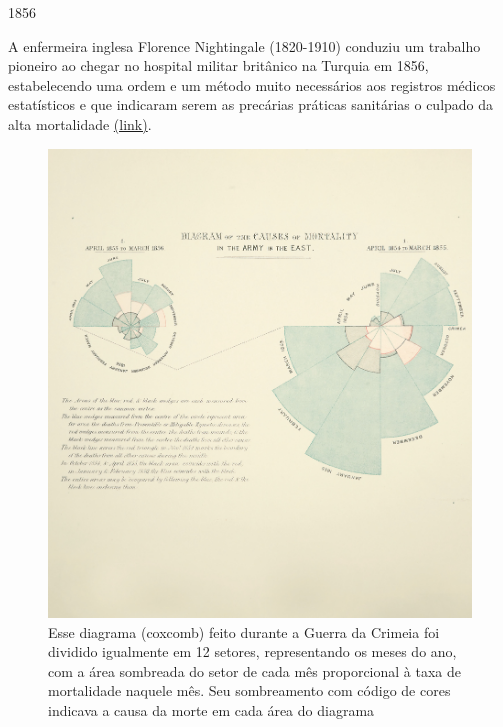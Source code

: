 \documentclass[
]{book}
\begin{document}
\hfill\break

1856

\hfill\break

A enfermeira inglesa Florence Nightingale (1820-1910) conduziu um trabalho pioneiro ao chegar no hospital militar britânico na Turquia em 1856, estabelecendo uma ordem e um método muito necessários aos registros médicos estatísticos e que indicaram serem as precárias práticas sanitárias o culpado da alta mortalidade \href{https://www.york.ac.uk/depts/maths/histstat/small.htm}{(link)}.

\hfill\break

\begin{figure}

{\centering \includegraphics[width=0.75\linewidth]{images1/florence-rose-diagram} 

}

\caption{Esse diagrama (coxcomb) feito durante a Guerra da Crimeia foi dividido igualmente em 12 setores, representando os meses do ano, com a área sombreada do setor  de cada mês proporcional à taxa de mortalidade naquele mês. Seu sombreamento com código de cores indicava a causa da morte em cada área do diagrama}\label{fig:unnamed-chunk-14}
\end{figure}

\hfill\break
\end{document}

